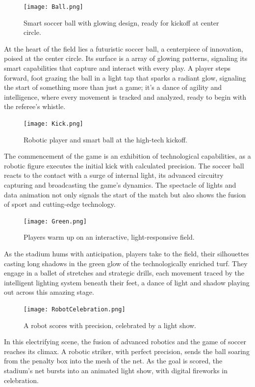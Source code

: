 \documentclass[11pt,a4paper,oneside]{report}
\begin{document}
\begin{figure}[htbp]
  \centering
  \texttt{[image: Ball.png]}
  \caption{Smart soccer ball with glowing design, ready for kickoff at center circle.}
\end{figure}
At the heart of the field lies a futuristic soccer ball, a centerpiece of innovation, poised at the center circle. 
Its surface is a array of glowing patterns, signaling its smart capabilities that capture and interact with every play. 
A player steps forward, foot grazing the ball in a light tap that sparks a radiant glow, signaling the start of something more than just a game; 
it's a dance of agility and intelligence, where every movement is tracked and analyzed, ready to begin with the referee's whistle.
\newpage

\begin{figure}[htbp]
  \centering
  \texttt{[image: Kick.png]}
  \caption{Robotic player and smart ball at the high-tech kickoff.}
\end{figure}

The commencement of the game is an exhibition of technological capabilities, as a robotic figure executes the initial kick with calculated precision. 
The soccer ball reacts to the contact with a surge of internal light, its advanced circuitry capturing and broadcasting the game's dynamics. 
The spectacle of lights and data animation not only signals the start of the match but also shows the fusion of sport and cutting-edge technology.
\newpage

\begin{figure}[htbp]
  \centering
  \texttt{[image: Green.png]}
  \caption{Players warm up on an interactive, light-responsive field.}
\end{figure}

As the stadium hums with anticipation, players take to the field, their silhouettes casting long shadows in the green glow of the technologically enriched turf. 
They engage in a ballet of stretches and strategic drills, each movement traced by the intelligent lighting system beneath their feet, a dance of light and shadow playing out across this amazing stage.
\newpage

\begin{figure}[htbp]
  \centering
  \texttt{[image: RobotCelebration.png]}
  \caption{A robot scores with precision, celebrated by a light show.}
\end{figure}

In this electrifying scene, the fusion of advanced robotics and the game of soccer reaches its climax. 
A robotic striker, with perfect precision, sends the ball soaring from the penalty box into the mesh of the net. 
As the goal is scored, the stadium's net bursts into an animated light show, with digital fireworks in celebration. 
\newpage
\end{document}
